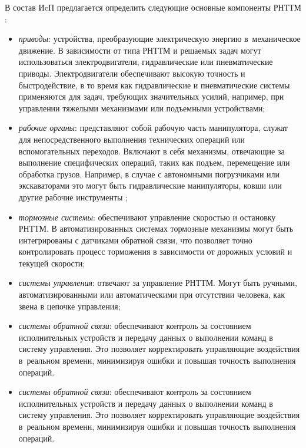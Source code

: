 В состав ИcП предлагается определить следующие основные компоненты РНТТМ \cite{Vilman, Evtukov, confbib4}:

\begin{itemize}[beginpenalty=10000, midpenalty=10000, wide=\parindent, leftmargin=0pt]
	\item \textit{приводы}:
	устройства, преобразующие электрическую энергию в~механическое движение. В зависимости от типа РНТТМ и решаемых задач могут использоваться электродвигатели, гидравлические или пневматические приводы. Электродвигатели обеспечивают высокую точность и быстродействие, в то время как гидравлические и пневматические системы применяются для задач, требующих значительных усилий, например, при управлении тяжелыми механизмами или подъемными устройствами;

	\item \textit{рабочие органы}:
	представляют собой рабочую часть манипулятора, служат для непосредственного выполнения технических операций или вспомогательных переходов. Включают в себя механизмы, отвечающие за выполнение специфических операций, таких как подъем, перемещение или обработка грузов. Например, в случае с автономными погрузчиками или экскаваторами это могут быть гидравлические манипуляторы, ковши или другие рабочие инструменты ;

	\item \textit{тормозные системы}:
	обеспечивают управление скоростью и остановку РНТТМ. В автоматизированных системах тормозные механизмы могут быть интегрированы с датчиками обратной связи, что позволяет точно контролировать процесс торможения в зависимости от дорожных условий и текущей скорости;

	\item \textit{системы управления}:
	отвечают за управление РНТТМ. Могут быть ручными, автоматизированными или автоматическими при отсутствии человека, как звена в цепочке управления;

	\item \textit{системы обратной связи}:
	обеспечивают контроль за состоянием исполнительных устройств и передачу данных о выполнении команд в систему управления. Это позволяет корректировать управляющие воздействия в~реальном времени, минимизируя ошибки и повышая точность выполнения операций.

	\item \textit{системы обратной связи}:
	обеспечивают контроль за состоянием исполнительных устройств и передачу данных о выполнении команд в систему управления. Это позволяет корректировать управляющие воздействия в~реальном времени, минимизируя ошибки и повышая точность выполнения операций.
\end{itemize}

